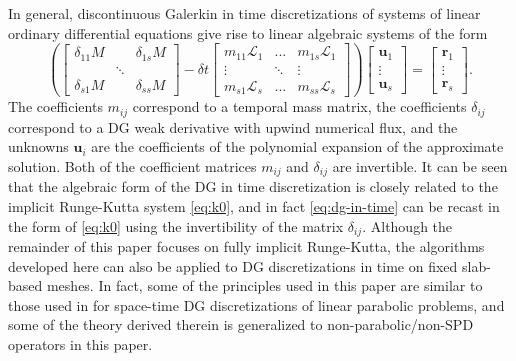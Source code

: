 \documentclass[review]{siamart}
\begin{document}
In general, discontinuous Galerkin in time discretizations of systems of linear ordinary differential equations give rise to linear algebraic systems of the form
\begin{equation} \label{eq:dg-in-time}
	\left( \begin{bmatrix}
		\delta_{11} M  & & \delta_{1s} M \\
		& \ddots \\
		\delta_{s1} M & & \delta_{ss} M
	\end{bmatrix}
	- \delta t \begin{bmatrix}
		m_{11}\mathcal{L}_1 & ... & m_{1s}\mathcal{L}_1 \\
		\vdots & \ddots & \vdots \\
		m_{s1}\mathcal{L}_s & ... & m_{ss} \mathcal{L}_s
	\end{bmatrix} \right)
		\begin{bmatrix} \mathbf{u}_1 \\ \vdots \\ \mathbf{u}_s \end{bmatrix}
		= \begin{bmatrix} \mathbf{r}_1 \\ \vdots \\ \mathbf{r}_s \end{bmatrix}.
\end{equation}
The coefficients $m_{ij}$ correspond to a temporal mass matrix, the coefficients $\delta_{ij}$ correspond to a DG weak derivative with upwind numerical flux, and the unknowns $\mathbf{u}_i$ are the coefficients of the polynomial expansion of the approximate solution.
Both of the coefficient matrices $m_{ij}$ and $\delta_{ij}$ are invertible.
It can be seen that the algebraic form of the DG in time discretization is closely related to the implicit Runge-Kutta system \eqref{eq:k0}, and in fact \eqref{eq:dg-in-time} can be recast in the form of \eqref{eq:k0} using the invertibility of the matrix $\delta_{ij}$.
Although the remainder of this paper focuses on fully implicit Runge-Kutta, the algorithms developed here can also be applied to DG discretizations in time on fixed slab-based meshes.
In fact, some of the principles used in this paper are similar to those used in \cite{exh} for space-time DG discretizations of linear parabolic problems, and some of the theory derived therein is generalized to non-parabolic/non-SPD operators in this paper.

\end{document}
